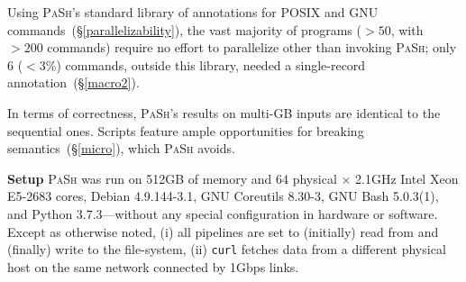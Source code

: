 \documentclass[sigplan, review, screen, anonymous]{acmart}
\newcommand{\ie}{{\em i.e.}, }
\newcommand{\heading}[1]{\vspace{4pt}\noindent\textbf{#1}\enspace}
\newcommand{\ttt}[1]{\texttt{#1}}
\newcommand{\todo}[1]{\hl{#1}\xspace}
\newcommand{\kk}[1]{[{\color{magenta}kk: #1}]}
\newcommand{\sx}[1]{(\S\ref{#1})}
\newcommand{\sys}{{\scshape PaSh}\xspace}
\begin{document}
Using \sys's standard library of annotations for POSIX and GNU commands~\sx{parallelizability}, the vast majority of programs ($>50$, with $>200$ commands) require no effort to parallelize other than invoking \sys;
  only 6 ($<3\%$) commands, outside this library, needed a single-record annotation~\sx{macro2}.

In terms of correctness, \sys's results on multi-GB inputs are identical to the sequential ones.
Scripts feature ample opportunities for breaking semantics~\sx{micro}, which \sys avoids.




\heading{Setup}
\sys was run on 512GB of memory and 64 physical $\times$ 2.1GHz Intel Xeon E5-2683 cores, Debian 4.9.144-3.1, GNU Coreutils 8.30-3, GNU Bash 5.0.3(1), and Python 3.7.3---without any special configuration in hardware or software.
Except as otherwise noted,
  (i) all pipelines are set to (initially) read from and (finally) write to the file-system,
  (ii) \ttt{curl} fetches data from a different physical host on the same network connected by 1Gbps links.
\end{document}
